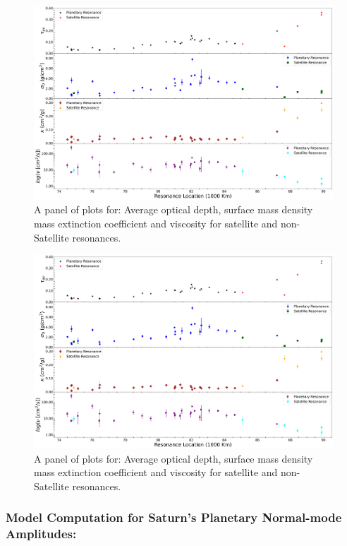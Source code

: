 \documentclass{article}
\begin{document}
\begin{figure}[h]
    \centering
    \includegraphics[width=0.9\linewidth]{tau_sigma_kappa_nu.png}
    \caption{A panel of plots for: Average optical depth, surface mass density mass extinction coefficient and viscosity for satellite and non-Satellite resonances.}
    \label{fig:enter-label}
\end{figure}

\begin{figure}
    \centering
    \includegraphics[width=0.9\linewidth]{tau_sigma_kapp_nu_capederrorbar.png}
    \caption{A panel of plots for: Average optical depth, surface mass density mass extinction coefficient and viscosity for satellite and non-Satellite resonances.}
    \label{fig:enter-label}
\end{figure}



\subsubsection{Model Computation for Saturn's Planetary Normal-mode Amplitudes:}
\end{document}

